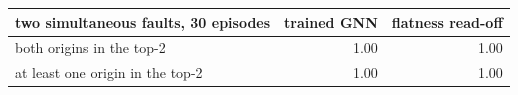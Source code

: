 \begin{center}\small\begin{tabular}{@{}lrr@{}}\toprule two simultaneous faults, 30 episodes & trained GNN & flatness read-off \\ \midrule
both origins in the top-2 & 1.00 & 1.00 \\
at least one origin in the top-2 & 1.00 & 1.00 \\
\bottomrule\end{tabular}\end{center}
